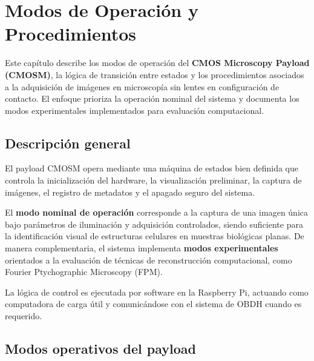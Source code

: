 \chapter{Modos de Operación y Procedimientos}
\label{ch:modos-operacion}

Este capítulo describe los modos de operación del \textbf{CMOS Microscopy Payload
(CMOSM)}, la lógica de transición entre estados y los procedimientos asociados a
la adquisición de imágenes en microscopía sin lentes en configuración de
contacto. El enfoque prioriza la operación nominal del sistema y documenta los
modos experimentales implementados para evaluación computacional.

\section{Descripción general}

El payload CMOSM opera mediante una máquina de estados bien definida que controla
la inicialización del hardware, la visualización preliminar, la captura de
imágenes, el registro de metadatos y el apagado seguro del sistema.

El \textbf{modo nominal de operación} corresponde a la captura de una imagen
única bajo parámetros de iluminación y adquisición controlados, siendo suficiente
para la identificación visual de estructuras celulares en muestras biológicas
planas. De manera complementaria, el sistema implementa \textbf{modos
experimentales} orientados a la evaluación de técnicas de reconstrucción
computacional, como Fourier Ptychographic Microscopy (FPM).

La lógica de control es ejecutada por software en la Raspberry Pi, actuando como
computadora de carga útil y comunicándose con el sistema de OBDH cuando es
requerido.

\section{Modos operativos del payload}

